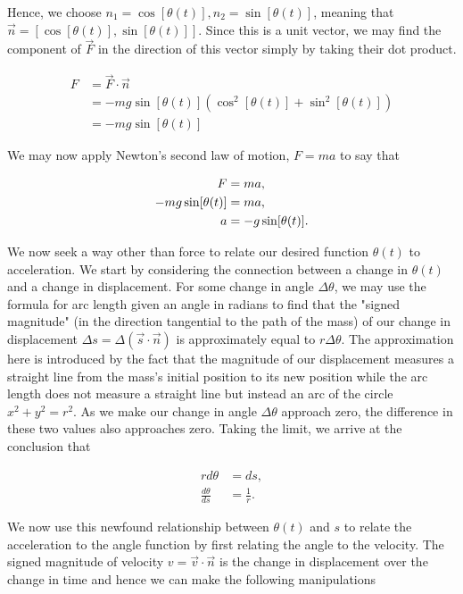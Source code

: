 \documentclass{article}
\begin{document}
Hence, we choose $n_1 = \cos[\theta(t)], n_2 = \sin[\theta(t)]$, meaning that $\vec{n} = [\cos[\theta(t)], \sin[\theta(t)]]$. Since this is a unit vector, we may find the component of $\vec{F}$ in the direction of this vector simply by taking their dot product.

\begin{align*}
	F &= \vec{F}\cdot\vec{n} \\
	&= -mg\sin[\theta(t)](\cos^2[\theta(t)] + \sin^2[\theta(t)]) \\
	&= -mg\sin[\theta(t)]
\end{align*}

We may now apply Newton's second law of motion, $F = ma$ to say that

\begin{align}
	F &= ma, \notag \\
	-mg\sin[\theta(t)] &= ma, \notag \\
	a &= -g\sin[\theta(t)].
\end{align}

We now seek a way other than force to relate our desired function $\theta(t)$ to acceleration. We start by considering the connection between a change in $\theta(t)$ and a change in displacement. For some change in angle $\Delta\theta$, we may use the formula for arc length given an angle in radians to find that the "signed magnitude" (in the direction tangential to the path of the mass) of our change in displacement $\Delta s = \Delta(\vec{s}\cdot\vec{n})$ is approximately equal to $r\Delta\theta$. The approximation here is introduced by the fact that the magnitude of our displacement measures a straight line from the mass's initial position to its new position while the arc length does not measure a straight line but instead an arc of the circle $x^2 + y^2 = r^2$. As we make our change in angle $\Delta\theta$ approach zero, the difference in these two values also approaches zero. Taking the limit, we arrive at the conclusion that

\begin{align*}
	rd\theta &= ds, \\
	\frac{d\theta}{ds} &= \frac{1}{r}.
\end{align*}

We now use this newfound relationship between $\theta(t)$ and $s$ to relate the acceleration to the angle function by first relating the angle to the velocity. The signed magnitude of velocity $v = \vec{v}\cdot\vec{n}$ is the change in displacement over the change in time and hence we can make the following manipulations
\end{document}
